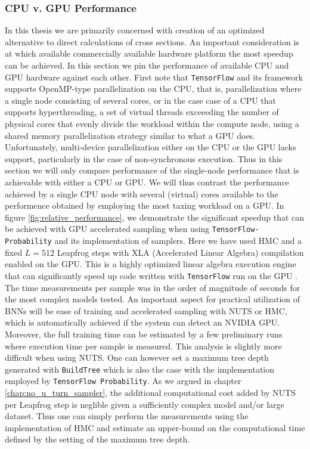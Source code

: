 \subsubsection{CPU v. GPU Performance}
In this thesis we are primarily concerned with creation of an optimized alternative to direct calculations of cross sections.
An important consideration is at which available commercially available hardware platform the most speedup can be achieved. In this section
we pin the performance of available CPU and GPU hardware against each other. First note that {\tt TensorFlow} and its framework supports OpenMP-type parallelization on the CPU, that is, parallelization where a single node consisting of several cores, or in the case case of a CPU that supports hyperthreading, a set of virtual threads exceeeding the number of physical cores that evenly divide the workload within the compute node, using a shared memory parallelization strategy similar to what a GPU does. Unfortunately, multi-device parallelization either on the CPU or the GPU lacks support, particularly in the case of non-synchronous execution. Thus in this section we will only compare performance of the single-node performance that is achievable with either a CPU or GPU. We will thus contrast the performance achieved by a single CPU node with several (virtual) cores available to the performence obtained by employing the most taxing workload on a GPU.
In figure \ref{fig:relative_performance}, we demonstrate the significant speedup that can be achieved
with GPU accelerated sampling when using {\tt TensorFlow-Probability} and its implementation of samplers. Here we have used HMC and a fixed $L = 512$ Leapfrog steps with XLA (Accelerated Linear Algebra) compilation enabled on the GPU. This is a highly optimized linear algebra execution engine that can significantly speed up code written with {\tt TensorFlow} run on the GPU \cite{xla}. The time measurements per sample was in the order of magnitude of seconds for the most complex models
tested. An important aspect for practical utilization of BNNs will be ease of training and accelerated sampling with NUTS or HMC, which is automatically achieved if the system can detect an NVIDIA GPU. Moreover, the full training time can be estimated by a few preliminary runs where execution time per sample is measured. This analysis is slightly more difficult when using NUTS. One can however set a maximum tree depth generated with {\tt BuildTree} which is also the case with the implementation employed by {\tt TensorFlow Probability}. As we argued in chapter \ref{chap:no_u_turn_sampler}, the additional computational cost added by NUTS per Leapfrog step is neglible given a sufficiently complex model and/or large dataset.
Thus one can simply perform the measurements using the implementation of HMC and estimate an upper-bound on the computational time defined by the setting of the maximum tree depth.

